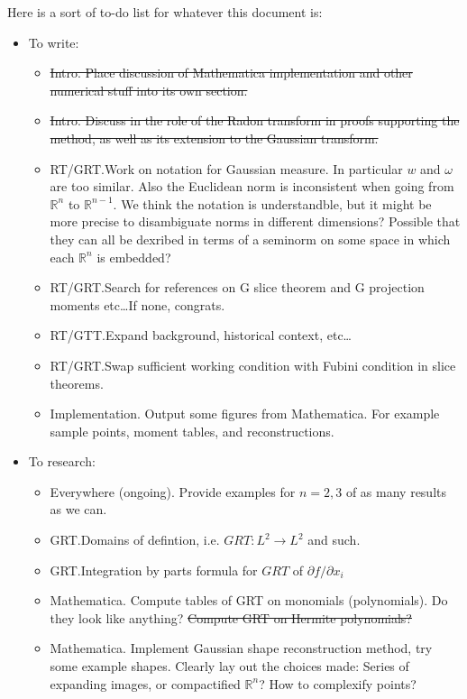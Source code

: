 \documentclass{amsart}
\theoremstyle{remark}
\numberwithin{equation}{section}
\newcommand{\RR}{\mathbb{R}}
\begin{document}
Here is a sort of to-do list for whatever this document is:
\begin{itemize}
\item To write:
\begin{itemize}
\item \sout{Intro. Place discussion of Mathematica implementation and other numerical stuff into its own section.}
\item \sout{Intro. Discuss in the role of the Radon transform in proofs supporting the method, as well as its extension to the Gaussian transform.}
\item RT/GRT.\@ Work on notation for Gaussian measure. In particular $w$ and $\omega$ are too similar. Also the Euclidean norm is inconsistent when going from $\RR^n$ to $\RR^{n-1}$. We think the notation is understandble, but it might be more precise to disambiguate norms in different dimensions? Possible that they can all be dexribed in terms of a seminorm on some space in which each $\RR^n$ is embedded? 
\item RT/GRT.\@ Search for references on G slice theorem and G projection moments etc\ldots If none, congrats.
\item RT/GTT.\@ Expand background, historical context, etc\ldots
\item RT/GRT.\@ Swap sufficient working condition with Fubini condition in slice theorems.
\item Implementation. Output some figures from Mathematica. For example sample points, moment tables, and reconstructions.
\end{itemize}

\item To research:
\begin{itemize}
\item Everywhere (ongoing). Provide examples for $n = 2, 3$ of as many results as we can.
\item GRT.\@ Domains of defintion, i.e. $GRT: L^2 \rightarrow L^2$ and such.
\item GRT.\@ Integration by parts formula for $GRT$ of $\partial f/\partial x_i$
\item Mathematica. Compute tables of GRT on monomials (polynomials). Do they look like anything? \sout{Compute GRT on Hermite polynomials?}
\item Mathematica. Implement Gaussian shape reconstruction method, try some example shapes. Clearly lay out the choices made: Series of expanding images, or compactified $\RR^n$? How to complexify points?
\end{itemize}
\end{itemize}
\end{document}
